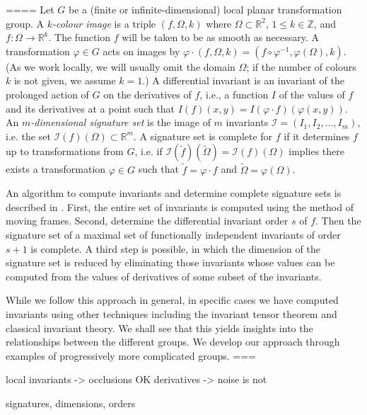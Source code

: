 \documentclass[review,onefignum,onetabnum]{siamonline190516}
\def\R{\mathbb{R}}
\begin{document}
====
Let $G$ be a (finite or infinite-dimensional) local planar transformation group. 
A {\em $k$-colour image} is a triple $(f,\Omega,k)$ where $\Omega\subset\R^2$, $1\le k\in\mathbb{Z}$,
and $f\colon\Omega\to\R^k$. The function $f$ will be taken to be as smooth as necessary.
A transformation $\varphi\in G$ acts on images by $\varphi\cdot (f,\Omega,k) = (f\circ\varphi^{-1},\varphi(\Omega),k)$.
(As we work locally, we will usually omit the domain $\Omega$; if the number of colours $k$ is not given, we assume $k=1$.)  A differential invariant is an invariant of the prolonged action of $G$ on the derivatives of $f$, i.e., a function $I$ of the values of $f$ and its derivatives at a point such that $I(f)(x,y) = I(\varphi\cdot f)(\varphi(x,y))$. An {\em $m$-dimensional signature set} is the image of $m$ invariants $\mathcal{I}=(I_1,I_2,\dots,I_m)$, i.e. the
set $\mathcal{I}(f)(\Omega)\subset \mathbb{R}^m$. 
A signature set is complete for $f$ if it determines $f$ up to transformations from $G$, i.e. if $\mathcal{I}(\tilde f)(\tilde\Omega) = \mathcal{I}(f)(\Omega)$ implies there exists a transformation $\varphi\in G$ such that $\tilde f = \varphi\cdot f$ and $\tilde \Omega = \varphi(\Omega)$.

An algorithm to compute invariants and determine complete signature sets is described in \cite{olver2001}. First, the
entire set of invariants is computed using the method of moving frames. Second, determine the differential invariant order $s$ of $f$. Then the signature set of a maximal set of functionally independent invariants of order $s+1$ is complete. A third step is possible, in which the dimension of the signature set is reduced by eliminating those invariants whose values can be computed from the values of derivatives of some subset of the invariants. 

While we follow this approach in general, in specific cases we have computed invariants using other techniques
including the invariant tensor theorem and classical invariant theory. We shall see that this yields insights into the relationships between the different groups. We develop our approach through examples of progressively more complicated groups.
===

local invariants -> occlusions OK
derivatives -> noise is not

signatures, dimensions, orders
\end{document}
